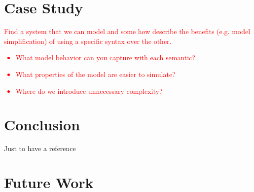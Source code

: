 \documentclass{easychair}
\begin{document}











\section{Case Study}
\label{sect:caseS}

\textcolor{red}{Find a system that we can model and some how describe the benefits 
(e.g. model simplification) of using a specific syntax over the other.
	\begin{itemize}
		\item What model behavior can you capture with each semantic?
		\item What properties of the model are easier to simulate?
		\item Where do we introduce unnecessary complexity?
	\end{itemize}	
}

\section{Conclusion}
\label{sect:concl}

Just to have a reference ~\cite{texniccenter}

\section{Future Work}
\label{sect:future-work}


\end{document}
